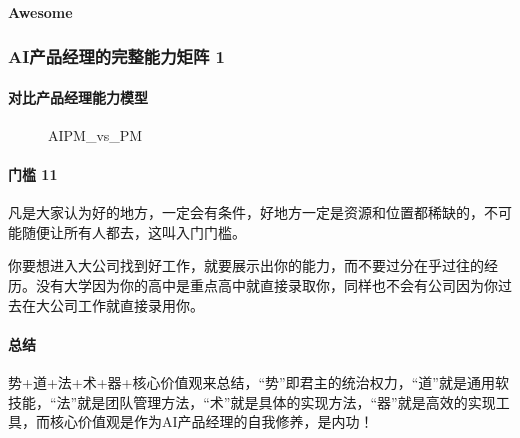 \documentclass[letterpaper,11pt,english]{sphinxmanual}
\begin{document}
\paragraph{Awesome}
\label{\detokenize{chapter_introduction/AI_PM:id45}}


\subsubsection{AI产品经理的完整能力矩阵 1\sphinxfootnotemark[270]}
\label{\detokenize{chapter_introduction/ability:ai-1}}\label{\detokenize{chapter_introduction/ability::doc}}%
\begin{footnotetext}[270]\sphinxAtStartFootnote
{}
%
\end{footnotetext}\ignorespaces 

\paragraph{对比产品经理能力模型}
\label{\detokenize{chapter_introduction/ability:id1}}
\begin{figure}[H]
\centering
\capstart

\noindent{}
\caption{AIPM\_vs\_PM}\label{\detokenize{chapter_introduction/ability:id19}}\end{figure}


\paragraph{门槛 11\sphinxfootnotemark[271]}
\label{\detokenize{chapter_introduction/ability:id2}}%
\begin{footnotetext}[271]\sphinxAtStartFootnote
{}
%
\end{footnotetext}\ignorespaces 
凡是大家认为好的地方，一定会有条件，好地方一定是资源和位置都稀缺的，不可能随便让所有人都去，这叫入门门槛。

你要想进入大公司找到好工作，就要展示出你的能力，而不要过分在乎过往的经历。没有大学因为你的高中是重点高中就直接录取你，同样也不会有公司因为你过去在大公司工作就直接录用你。


\paragraph{总结}
\label{\detokenize{chapter_introduction/ability:id3}}
势+道+法+术+器+核心价值观来总结，“势”即君主的统治权力，“道”就是通用软技能，“法”就是团队管理方法，“术”就是具体的实现方法，“器”就是高效的实现工具，而核心价值观是作为AI产品经理的自我修养，是内功！
\end{document}
